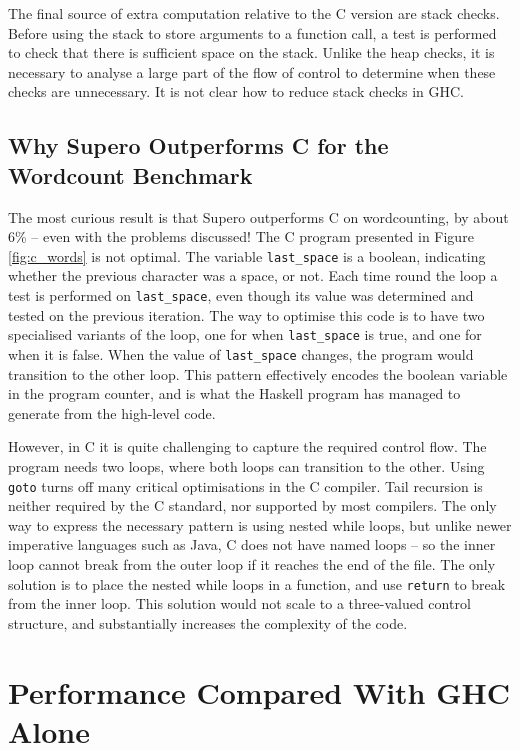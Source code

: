 The final source of extra computation relative to the C version are stack checks. Before using the stack to store arguments to a function call, a test is performed to check that there is sufficient space on the stack. Unlike the heap checks, it is necessary to analyse a large part of the flow of control to determine when these checks are unnecessary. It is not clear how to reduce stack checks in GHC.

\subsection{Why Supero Outperforms C for the Wordcount Benchmark}

The most curious result is that Supero outperforms C on wordcounting, by about 6\% -- even with the problems discussed! The C program presented in Figure \ref{fig:c_words} is not optimal. The variable \verb"last_space" is a boolean, indicating whether the previous character was a space, or not. Each time round the loop a test is performed on \verb"last_space", even though its value was determined and tested on the previous iteration. The way to optimise this code is to have two specialised variants of the loop, one for when \verb"last_space" is true, and one for when it is false. When the value of \verb"last_space" changes, the program would transition to the other loop. This pattern effectively encodes the boolean variable in the program counter, and is what the Haskell program has managed to generate from the high-level code.

However, in C it is quite challenging to capture the required control flow. The program needs two loops, where both loops can transition to the other. Using \texttt{goto} turns off many critical optimisations in the C compiler. Tail recursion is neither required by the C standard, nor supported by most compilers. The only way to express the necessary pattern is using nested while loops, but unlike newer imperative languages such as Java, C does not have named loops -- so the inner loop cannot break from the outer loop if it reaches the end of the file. The only solution is to place the nested while loops in a function, and use \texttt{return} to break from the inner loop. This solution would not scale to a three-valued control structure, and substantially increases the complexity of the code.

\section{Performance Compared With GHC Alone}
\label{sec:haskell_results}

